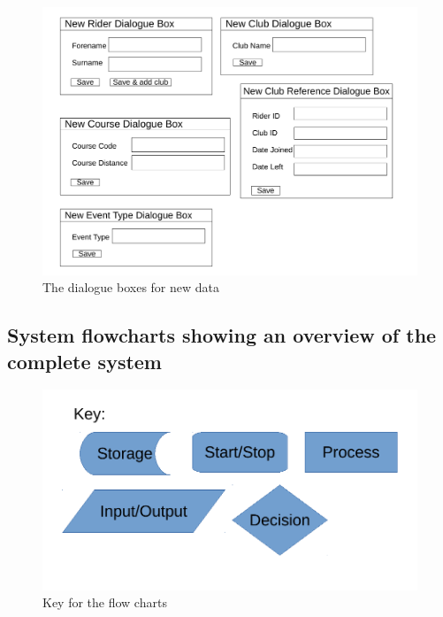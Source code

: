 \begin{figure}[H]
	\includegraphics[width=\textwidth]{./UIDesign/Dialogs.pdf}
	\caption{The dialogue boxes for new data} \label{fig:The dialogue boxes for new data} 	
\end{figure}

\subsection{System flowcharts showing an overview of the complete system}

\begin{figure}[H]
	\includegraphics[width=\textwidth]{./FlowChart/Key.pdf}
	\caption{Key for the flow charts} \label{fig:Key for the flow charts} 	
\end{figure}

